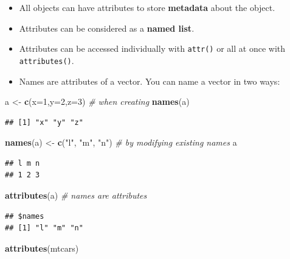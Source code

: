 \documentclass[]{book}
\newenvironment{Shaded}{\begin{snugshade}}{\end{snugshade}}
\newcommand{\KeywordTok}[1]{\textcolor[rgb]{0.13,0.29,0.53}{\textbf{{#1}}}}
\newcommand{\DataTypeTok}[1]{\textcolor[rgb]{0.13,0.29,0.53}{{#1}}}
\newcommand{\DecValTok}[1]{\textcolor[rgb]{0.00,0.00,0.81}{{#1}}}
\newcommand{\StringTok}[1]{\textcolor[rgb]{0.31,0.60,0.02}{{#1}}}
\newcommand{\CommentTok}[1]{\textcolor[rgb]{0.56,0.35,0.01}{\textit{{#1}}}}
\newcommand{\NormalTok}[1]{{#1}}
\providecommand{\tightlist}{%
  \setlength{\itemsep}{0pt}\setlength{\parskip}{0pt}}
\begin{document}
\begin{itemize}
\tightlist
\item
  All objects can have attributes to store \textbf{metadata} about the
  object.
\item
  Attributes can be considered as a \textbf{named list}.
\item
  Attributes can be accessed individually with \texttt{attr()} or all at
  once with \texttt{attributes()}.
\item
  Names are attributes of a vector. You can name a vector in two ways:
\end{itemize}

\begin{Shaded}
\begin{Highlighting}[]
\NormalTok{a <-}\StringTok{ }\KeywordTok{c}\NormalTok{(}\DataTypeTok{x=}\DecValTok{1}\NormalTok{,}\DataTypeTok{y=}\DecValTok{2}\NormalTok{,}\DataTypeTok{z=}\DecValTok{3}\NormalTok{)   }\CommentTok{# when creating}
\KeywordTok{names}\NormalTok{(a)}
\end{Highlighting}
\end{Shaded}

\begin{verbatim}
## [1] "x" "y" "z"
\end{verbatim}

\begin{Shaded}
\begin{Highlighting}[]
\KeywordTok{names}\NormalTok{(a) <-}\StringTok{ }\KeywordTok{c}\NormalTok{(}\StringTok{"l"}\NormalTok{, }\StringTok{"m"}\NormalTok{, }\StringTok{"n"}\NormalTok{)   }\CommentTok{# by modifying existing names}
\NormalTok{a}
\end{Highlighting}
\end{Shaded}

\begin{verbatim}
## l m n 
## 1 2 3
\end{verbatim}

\begin{Shaded}
\begin{Highlighting}[]
\KeywordTok{attributes}\NormalTok{(a)    }\CommentTok{# names are attributes}
\end{Highlighting}
\end{Shaded}

\begin{verbatim}
## $names
## [1] "l" "m" "n"
\end{verbatim}

\begin{Shaded}
\begin{Highlighting}[]
\KeywordTok{attributes}\NormalTok{(mtcars)}
\end{Highlighting}
\end{Shaded}
\end{document}
